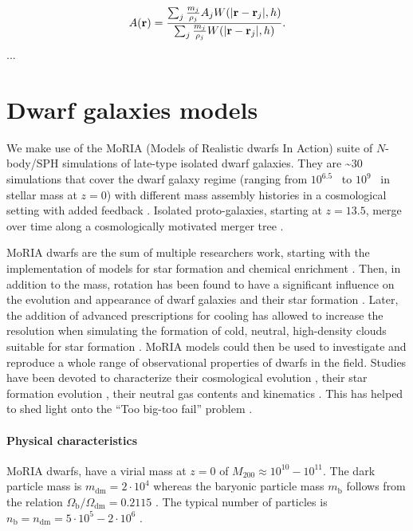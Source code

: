 \begin{equation}
 A(\boldsymbol{\mathbf{r}}) = \dfrac{\sum_j \frac{m_j}{\rho_j} A_j W(|\boldsymbol{\mathbf{r}} - \boldsymbol{\mathbf{r}}_j|,h)}{\sum_j \frac{m_j}{\rho_j} W(|\boldsymbol{\mathbf{r}} - \boldsymbol{\mathbf{r}}_j|,h)}.
\end{equation}
...

\section{Dwarf galaxies models}
\label{sec:dwarf_models}
We make use of the MoRIA (Models of Realistic dwarfs In Action) suite of $N$-body/SPH simulations of late-type isolated dwarf galaxies.
They are \textasciitilde$30$ simulations that cover the dwarf galaxy regime (ranging from $10^{6.5}$~\Msun{} to $10^9$~\Msun{} in stellar mass at $z=0$) with different mass assembly histories in a cosmological setting with added \popiii{} feedback \citep{Verbeke2017}.
Isolated proto-galaxies, starting at $z = 13.5$, merge over time along a cosmologically motivated merger tree \citep{Cloet-Osselaer2014}.

MoRIA dwarfs are the sum of multiple researchers work, starting with the implementation of models for star formation and chemical enrichment \citep{Valcke2008}. 
Then, in addition to the mass, rotation has been found to have a significant influence on the evolution and appearance of dwarf galaxies and their star formation \citep{Schroyen2011}.
Later, the addition of advanced prescriptions for cooling has allowed to increase the resolution when simulating the formation of cold, neutral, high-density clouds suitable for star formation \citep{DeRijcke2013}. %
MoRIA models could then be used to investigate and reproduce a whole range of observational properties of dwarfs in the field.
Studies have been devoted to characterize their cosmological evolution \citep{Cloet-Osselaer2012}, their star formation evolution \citep{Verbeke2015}, their neutral gas contents and kinematics \citep{Koleva2014}.
This has helped to shed light onto the ``Too big-too fail'' problem \citep{Verbeke2017}.


\paragraph{Physical characteristics} MoRIA dwarfs, have a virial mass at $z=0$ of $M_{200} \approx 10^{10} - 10^{11}$\Msun{}. The dark particle mass is $m_{\mathrm{dm}} = 2 \cdot 10^4$ \Msun{} whereas the baryonic particle mass $m_{\mathrm{b}}$ follows from the relation $\Omega_\mathrm{b}/\Omega_{\mathrm{dm}} = 0.2115$ \citep{Planck2015}.
The typical number of particles is $n_\mathrm{b} = n_{\mathrm{dm}} = 5 \cdot 10^5 - 2 \cdot 10^6$ \Msun{}.

